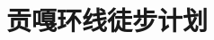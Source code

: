 \documentclass[a4, 12pt, UTF8]{ctexart}
\title{贡嘎环线徒步计划}
\begin{document}
  \maketitle

  \renewcommand{\contentsname}{目录}
  \renewcommand{\refname}{参考文献}

  \tableofcontents

  

  

  




\end{document}
